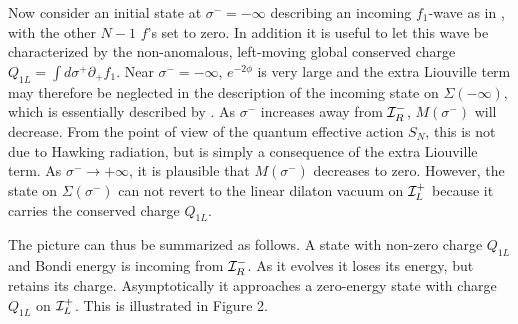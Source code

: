 Now consider an initial state at $\sigma^-=-\infty$ describing an incoming
$f_1$-wave as in \twelve, with the other $N-1$ $f$'s set to zero.
In addition it is useful to let
this wave be characterized by the non-anomalous,
left-moving global conserved charge $Q_{1L}=\int d \sigma^+ \partial_+f_1$.
Near $\sigma^-=-\infty$, $e^{-2\phi}$ is very
large  and the extra Liouville term may therefore be
neglected in the description of the incoming state on $\Sigma (-\infty)$, which
is essentially described by \thirteen.
As $\sigma^-$ increases away from ${\cal I}^-_R$, $M(\sigma^-)$ will
decrease.  From the point of view of the quantum effective action $S_N$,
this is not due to Hawking radiation, but is simply a consequence of the
extra Liouville term.  As $\sigma^-\to +\infty$, it is
plausible that $M(\sigma^-)$ decreases to zero.
However, the state on $\Sigma (\sigma^-)$ can not revert to the linear dilaton
vacuum on ${\cal I}^+_L$ because it carries the conserved charge $Q_{1L}$.

The picture can thus be summarized as  follows.  A state with non-zero
charge $Q_{1L}$ and
Bondi energy is incoming from ${\cal I}^-_R$.  As it evolves it loses its
energy, but retains its charge.  Asymptotically it approaches a
zero-energy state with charge $Q_{1L}$ on ${\cal I}^+_L$. This
is illustrated in Figure 2.
\goodbreak
\topinsert
\centerline{}
\endinsert


